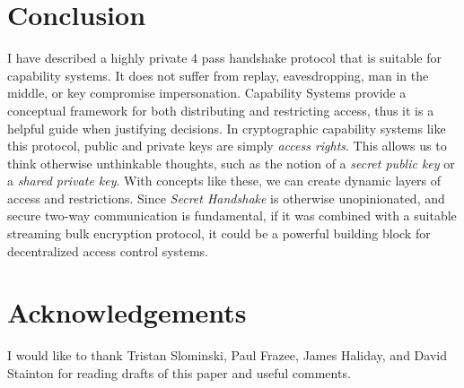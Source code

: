 \documentclass[12pt]{article}
\begin{document}
\section{Conclusion}

I have described a highly private 4 pass handshake protocol
that is suitable for capability systems. It does not suffer
from replay, eavesdropping, man in the middle,
or key compromise impersonation.
Capability Systems provide a conceptual framework for both
distributing and restricting access, thus it is a helpful
guide when justifying decisions.
In cryptographic capability systems like this protocol, public and
private keys are simply \emph{access rights}. This allows us to
think otherwise unthinkable thoughts, such as the notion of a
\emph{secret public key} or a \emph{shared private key}.
With concepts like these, we can create dynamic
layers of access and restrictions. Since \emph{Secret Handshake} is
otherwise unopinionated, and secure two-way communication is fundamental,
if it was combined with a suitable streaming bulk encryption protocol,
it could be a powerful building block for decentralized access
control systems.

\section*{Acknowledgements}

I would like to thank Tristan Slominski, Paul Frazee, James Haliday,
and David Stainton for reading drafts of this paper and useful comments.




\end{document}
